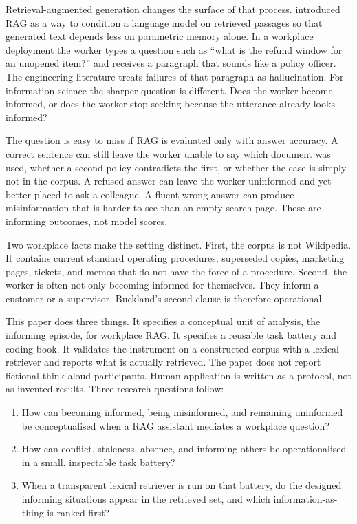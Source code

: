 \documentclass{isi2027}
\begin{document}
Retrieval-augmented generation changes the surface of that process. \citet{Lewis2020} introduced RAG as a way to condition a language model on retrieved passages so that generated text depends less on parametric memory alone. In a workplace deployment the worker types a question such as ``what is the refund window for an unopened item?'' and receives a paragraph that sounds like a policy officer. The engineering literature treats failures of that paragraph as hallucination. For information science the sharper question is different. Does the worker become informed, or does the worker stop seeking because the utterance already looks informed?

The question is easy to miss if RAG is evaluated only with answer accuracy. A correct sentence can still leave the worker unable to say which document was used, whether a second policy contradicts the first, or whether the case is simply not in the corpus. A refused answer can leave the worker uninformed and yet better placed to ask a colleague. A fluent wrong answer can produce misinformation that is harder to see than an empty search page. These are informing outcomes, not model scores.

Two workplace facts make the setting distinct. First, the corpus is not Wikipedia. It contains current standard operating procedures, superseded copies, marketing pages, tickets, and memos that do not have the force of a procedure. Second, the worker is often not only becoming informed for themselves. They inform a customer or a supervisor. Buckland's second clause is therefore operational.

This paper does three things. It specifies a conceptual unit of analysis, the informing episode, for workplace RAG. It specifies a reusable task battery and coding book. It validates the instrument on a constructed corpus with a lexical retriever and reports what is actually retrieved. The paper does not report fictional think-aloud participants. Human application is written as a protocol, not as invented results. Three research questions follow:

\begin{enumerate}
  \item How can becoming informed, being misinformed, and remaining uninformed be conceptualised when a RAG assistant mediates a workplace question?
  \item How can conflict, staleness, absence, and informing others be operationalised in a small, inspectable task battery?
  \item When a transparent lexical retriever is run on that battery, do the designed informing situations appear in the retrieved set, and which information-as-thing is ranked first?
\end{enumerate}
\end{document}
